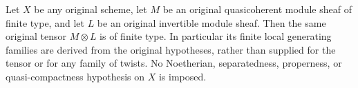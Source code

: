 \begin{theorem}
\label{lem:scheme-original-invertible-tensor-finite-type}
\leanok
Let $X$ be any original scheme, let $M$ be an original quasicoherent
module sheaf of finite type, and let $L$ be an original invertible
module sheaf. Then the same original tensor $M\otimes L$ is of
finite type. In particular its finite local generating families are
derived from the original hypotheses, rather than supplied for the
tensor or for any family of twists. No Noetherian, separatedness,
properness, or quasi-compactness hypothesis on $X$ is imposed.
\end{theorem}
